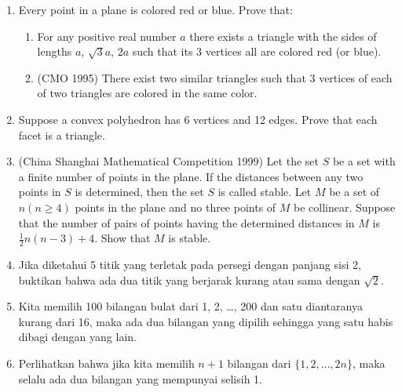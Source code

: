 \documentclass[11pt]{scrartcl}
\begin{document}
\begin{enumerate}
    \item Every point in a plane is colored red or blue. Prove that:
    \begin{enumerate}
        \item For any positive real number $a$ there exists a triangle with the sides of lengths $a$, $\sqrt{3}a$, $2a$ such that its 3 vertices all are colored red (or blue).
        \item (CMO 1995) There exist two similar triangles such that 3 vertices of each of two triangles are colored in the same color.
    \end{enumerate}
    \item Suppose a convex polyhedron has 6 vertices and 12 edges. Prove that each facet is a triangle.
    \item (China Shanghai Mathematical Competition 1999) Let the set $S$ be a set with a finite number of points in the plane. If the distances between any two points in $S$ is determined, then the set $S$ is called stable. Let $M$ be a set of $n (n \geq 4)$ points in the plane and no three points of $M$ be collinear. Suppose that the number of pairs of points having the determined distances in $M$ is $\frac{1}{2}n(n - 3) + 4$. Show that $M$ is stable.
    
    \item Jika diketahui 5 titik yang terletak pada persegi dengan panjang sisi 2, buktikan bahwa ada dua titik yang berjarak kurang atau sama dengan $\sqrt{2}$.
    
    \item Kita memilih 100 bilangan bulat dari 1, 2, \ldots, 200 dan satu diantaranya kurang dari 16, maka ada dua bilangan yang dipilih sehingga yang satu habis dibagi dengan yang lain.
    
    \item Perlihatkan bahwa jika kita memilih $n + 1$ bilangan dari $\{1, 2, \ldots, 2n\}$, maka selalu ada dua bilangan yang mempunyai selisih 1.
    

\end{enumerate}
\end{document}
